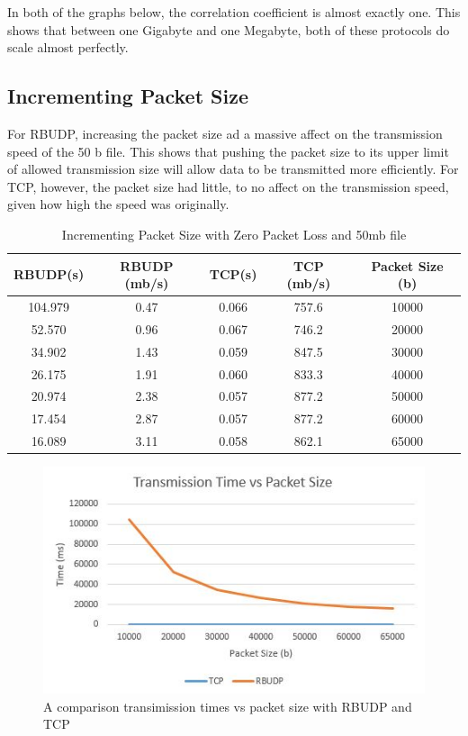 \documentclass[13pt]{article}
\begin{document}
In both of the graphs below, the correlation coefficient is almost exactly one. This
shows that between one Gigabyte and one Megabyte, both of these protocols do
scale almost perfectly.

\clearpage

\subsection{Incrementing Packet Size}

For RBUDP, increasing the packet size ad a massive affect on the transmission
speed of the 50 b file. This shows that pushing the packet size to its upper
limit of allowed transmission size will allow data to be transmitted more
efficiently. For TCP, however, the packet size had little, to no affect on the
transmission speed, given how high the speed was originally.

\begin{table}[!h]
\caption{Incrementing Packet Size with Zero Packet Loss and 50mb file}
\begin{center}
\begin{tabular}{|c|c|c|c|c|}
\hline RBUDP(s) & RBUDP (mb/s) & TCP(s) & TCP (mb/s) & Packet Size (b) \\
\hline 104.979& 0.47 & 0.066&757.6&10000 \\
\hline 52.570 & 0.96 & 0.067&746.2&20000 \\
\hline 34.902 & 1.43 & 0.059&847.5&30000 \\
\hline 26.175 & 1.91 & 0.060&833.3&40000 \\
\hline 20.974 & 2.38 & 0.057&877.2&50000 \\
\hline 17.454 & 2.87 & 0.057&877.2&60000 \\
\hline 16.089 & 3.11 & 0.058&862.1&65000 \\
\hline
\end{tabular}
\end{center}
\end{table}

\begin{figure}[!h]
  \includegraphics{packetSize.JPG}
  \caption{A comparison transimission times vs packet size with RBUDP and TCP}
\end{figure}
\end{document}
